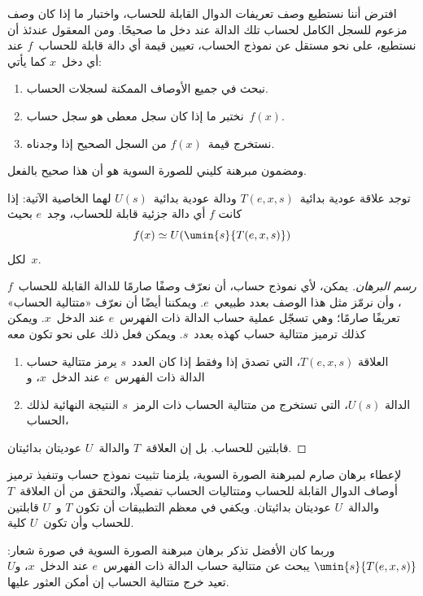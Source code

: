 \documentclass[../../../include/open-logic-section]{subfiles}
\begin{document}

افترض أننا نستطيع وصف تعريفات الدوال القابلة للحساب، واختبار ما إذا
كان وصف مزعوم للسجل الكامل لحساب تلك الدالة عند دخل ما صحيحًا. ومن
المعقول عندئذ أن نستطيع، على نحو مستقل عن نموذج الحساب، تعيين قيمة أي
دالة قابلة للحساب~$f$ عند أي دخل~$x$ كما يأتي:
\begin{enumerate}
  \item نبحث في جميع الأوصاف الممكنة لسجلات الحساب.
  \item نختبر ما إذا كان سجل معطى هو سجل حساب~$f(x)$.
  \item نستخرج قيمة~$f(x)$ من السجل الصحيح إذا وجدناه.
\end{enumerate}
ومضمون مبرهنة كليني للصورة السوية هو أن هذا صحيح بالفعل.

\begin{thm}
توجد علاقة عودية بدائية~$T(e,x,s)$ ودالة عودية بدائية~$U(s)$ لهما
الخاصية الآتية: إذا كانت $f$ أي دالة جزئية قابلة للحساب، وجد~$e$ بحيث
\[
f(x) \simeq U(\umin{s}{T(e, x, s)})
\]
لكل~$x$.
\end{thm}

\begin{proof}[رسم البرهان]
يمكن، لأي نموذج حساب، أن نعرّف وصفًا صارمًا للدالة القابلة
للحساب~$f$، وأن نرمّز مثل هذا الوصف بعدد طبيعي~$e$. ويمكننا أيضًا أن نعرّف
«متتالية الحساب» تعريفًا صارمًا؛ وهي تسجّل عملية حساب الدالة ذات
الفهرس~$e$ عند الدخل~$x$. ويمكن كذلك ترميز متتالية حساب كهذه بعدد~$s$.
ويمكن فعل ذلك على نحو تكون معه
\begin{enumerate}
  \item العلاقة $T(e,x,s)$، التي تصدق إذا وفقط إذا كان العدد~$s$
  يرمز متتالية حساب الدالة ذات الفهرس~$e$ عند الدخل~$x$، و
  \item الدالة $U(s)$، التي تستخرج من متتالية الحساب ذات الرمز~$s$
  النتيجة النهائية لذلك الحساب،
\end{enumerate}
قابلتين للحساب. بل إن العلاقة~$T$ والدالة~$U$ عوديتان بدائيتان.
\end{proof}

\begin{explain}
لإعطاء برهان صارم لمبرهنة الصورة السوية، يلزمنا تثبيت نموذج حساب وتنفيذ
ترميز أوصاف الدوال القابلة للحساب ومتتاليات الحساب تفصيلًا، والتحقق من
أن العلاقة~$T$ والدالة~$U$ عوديتان بدائيتان. ويكفي في معظم التطبيقات
أن تكون $T$ و~$U$ قابلتين للحساب وأن تكون~$U$ كلية.

وربما كان الأفضل تذكر برهان مبرهنة الصورة السوية في صورة شعار:
$\umin{s}{T(e,x,s)}$ يبحث عن متتالية حساب الدالة ذات الفهرس~$e$ عند
الدخل~$x$، و$U$ تعيد خرج متتالية الحساب إن أمكن العثور عليها.
\end{explain}
\end{document}
